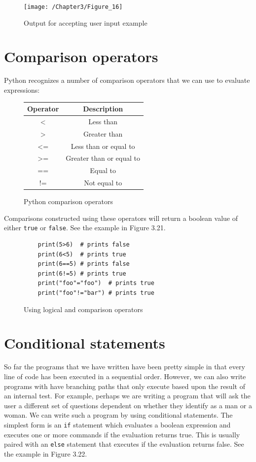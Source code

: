 \documentclass{book}
\begin{document}
\begin{figure}[h]
	\caption{Output for accepting user input example}
	\centering\texttt{[image: /Chapter3/Figure\_16]}
\end{figure}

\section{Comparison operators}

Python recognizes a number of comparison operators that we can use to evaluate expressions:

\begin{figure}[h]
	\caption{Python comparison operators}
	\centering
\begin{center}
	\begin{tabular}{|c | c|}
		\hline Operator & Description \\ [0.5ex]
		\hline
		\textless & Less than \\
		\hline
		\textgreater & Greater than \\
		\hline
		\textless = & Less than or equal to \\
		\hline
		\textgreater = & Greater than or equal to \\
		\hline
		== & Equal to \\
		\hline
		!= & Not equal to \\ [1ex]
		\hline
	\end{tabular}
\end{center}
\end{figure}

Comparisons constructed using these operators will return a boolean value of either \texttt{true} or \texttt{false}. See the example in Figure 3.21.

\begin{figure}[h]
	\caption{Using logical and comparison operators}
	\begin{lstlisting}
	print(5>6)	# prints false
	print(6<5)	# prints true
	print(6==5)	# prints false
	print(6!=5)	# prints true
	print("foo"="foo")	# prints true
	print("foo"!="bar")	# prints true
	\end{lstlisting}
\end{figure}

\section{Conditional statements}

So far the programs that we have written have been pretty simple in that every line of code has been executed in a sequential order. However, we can also write programs with have branching paths that only execute based upon the result of an internal test. For example, perhaps we are writing a program that will ask the user a different set of questions dependent on whether they identify as a man or a woman. We can write such a program by using conditional statements. The simplest form is an \texttt{if} statement which evaluates a boolean expression and executes one or more commands if the evaluation returns true. This is usually paired with an \texttt{else} statement that executes if the evaluation returns false. See the example in Figure 3.22.
\end{document}

